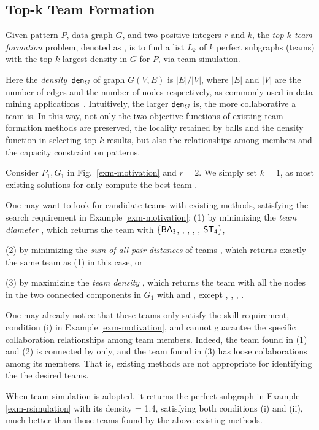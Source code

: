 \subsection{Top-k Team Formation}
\label{subsec-teamF}

 Given pattern $P$, data graph $G$, and two positive integers $r$ and $k$, the {\em top-$k$ team formation} problem, denoted as ,
is to find a list $L_{k}$ of $k$ perfect subgraphs (\ie teams) with the top-$k$ largest density in $G$ for $P$, via team simulation.

Here the {\em density}\, ${\mathsf{den}}_{G}$ of graph $G(V, E)$ is $|E|/|V|$, where $|E|$ and $|V|$ are the number of edges and the number of nodes respectively, as commonly used in data mining applications~\cite{maximumDenseSubgraph,EVMK12}.
Intuitively, the larger ${\mathsf{den}}_{G}$ is, the more collaborative a team is.
In this way, not only the two objective functions of existing team formation methods are preserved,
\ie the locality retained by balls and the density function in selecting top-$k$ results,
but also the relationships among members and the capacity constraint on patterns.


\begin{example}
\label{exa-teamF}
Consider $P_1, G_1$ in Fig.~\ref{exm-motivation} and $r=2$.
We simply set $k=1$, as most existing solutions for \teamF{} only compute the best team \cite{Lappas09,ArisLuca12,GajewarS12,realTeamForm13,SamikKVM12}.

One may want to look for candidate teams with existing methods, satisfying the search requirement in Example \ref{exm-motivation}:
\ni(1) by minimizing the {\em team diameter} \cite{Lappas09},
which returns the team with $\{{\mathsf{BA_3}}$, , , , , ${\mathsf{ST_4}}\}$,

\ni(2) by minimizing the {\em sum of all-pair distances} of teams \cite{Kargar11},
which returns exactly the same team as (1) in this case, or

\ni(3) by maximizing the {\em team density} \cite{GajewarS12}, which returns the team with all the nodes in the two connected components in $G_1$ with  and , except , , , .

One may already notice that these teams only satisfy the skill requirement, \ie condition (i) in Example \ref{exm-motivation}, and cannot guarantee  the specific collaboration relationships among team members.
Indeed, the team found in (1) and (2) is connected by  only, and the team found in (3) has loose collaborations among its members.
That is, existing methods are not appropriate for identifying the the desired teams.

When team simulation is adopted, it returns the perfect subgraph in Example \ref{exm-rsimulation} with its density = 1.4,
satisfying both conditions (i) and (ii), much better than those teams found by the above existing methods.
\end{example}

